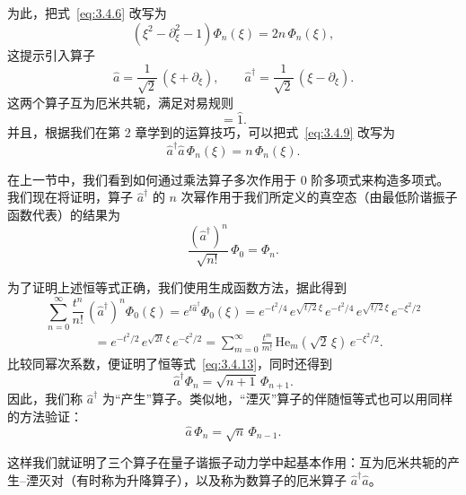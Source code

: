 为此，把式~\eqref{eq:3.4.6} 改写为
\begin{equation}
\left(\xi^2-\partial_\xi^2-1\right)\Phi_n(\xi)=2n\,\Phi_n(\xi),
\label{eq:3.4.9}
\end{equation}
这提示引入算子
\begin{equation}
\hat a=\frac{1}{\sqrt{2}}\,(\xi+\partial_\xi),\qquad
\hat a^\dagger=\frac{1}{\sqrt{2}}\,(\xi-\partial_\xi).
\label{eq:3.4.10}
\end{equation}
这两个算子互为厄米共轭，满足对易规则
\begin{equation}
[\hat a,\hat a^\dagger]=\hat 1.
\label{eq:3.4.11}
\end{equation}
并且，根据我们在第 2 章学到的运算技巧，可以把式~\eqref{eq:3.4.9} 改写为
\begin{equation}
\hat a^\dagger\hat a\,\Phi_n(\xi)=n\,\Phi_n(\xi).
\label{eq:3.4.12}
\end{equation}

在上一节中，我们看到如何通过乘法算子多次作用于 0 阶多项式来构造多项式。我们现在将证明，算子 $\hat a^\dagger$ 的 $n$ 次幂作用于我们所定义的真空态（由最低阶谐振子函数代表）的结果为
\begin{equation}
\frac{(\hat a^\dagger)^n}{\sqrt{n!}}\,\Phi_0=\Phi_n.
\label{eq:3.4.13}
\end{equation}

为了证明上述恒等式正确，我们使用生成函数方法，据此得到
\[
\sum_{n=0}^{\infty}\frac{t^n}{n!}\,(\hat a^\dagger)^n\Phi_0(\xi)
=e^{t\hat a^\dagger}\Phi_0(\xi)
=e^{-t^2/4}\,e^{\sqrt{t/2}\,\xi}\,
 e^{-t^2/4}\,e^{\sqrt{t/2}\,\xi}\,e^{-\xi^2/2}
\]
\begin{align*}
&=e^{-t^2/2}\,e^{\sqrt{2t}\,\xi}\,e^{-\xi^2/2}
 =\sum_{m=0}^{\infty}\frac{t^m}{m!}\,
  \mathrm{He}_m\!\left(\sqrt{2}\,\xi\right)\,e^{-\xi^2/2}.
\tag{3.4.14}
\end{align*}
比较同幂次系数，便证明了恒等式~\eqref{eq:3.4.13}，同时还得到
\begin{equation}
\hat a^\dagger\Phi_n=\sqrt{n+1}\,\Phi_{n+1}.
\label{eq:3.4.15}
\end{equation}
因此，我们称 $\hat a^\dagger$ 为``产生''算子。类似地，``湮灭''算子的伴随恒等式也可以用同样的方法验证：
\begin{equation}
\hat a\,\Phi_n=\sqrt{n}\,\Phi_{n-1}.
\label{eq:3.4.16}
\end{equation}

这样我们就证明了三个算子在量子谐振子动力学中起基本作用：互为厄米共轭的产生--湮灭对（有时称为升降算子），以及称为数算子的厄米算子 $\hat a^\dagger\hat a$。

